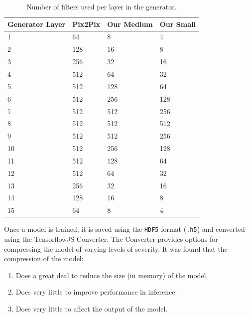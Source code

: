 \documentclass{article}
\begin{document}
\begin{small}
	\begin{table}
		\begin{center}
			\begin{tabular}{p{2cm}p{2cm}p{2cm}p{2cm}}
				\toprule
				Generator Layer & Pix2Pix & Our Medium & Our Small \\
				\midrule
				1               & 64      & 8          & 4         \\
				2               & 128     & 16         & 8         \\
				3               & 256     & 32         & 16        \\
				4               & 512     & 64         & 32        \\
				5               & 512     & 128        & 64        \\
				6               & 512     & 256        & 128       \\
				7               & 512     & 512        & 256       \\
				8               & 512     & 512        & 512       \\
				9               & 512     & 512        & 256       \\
				10              & 512     & 256        & 128       \\
				11              & 512     & 128        & 64        \\
				12              & 512     & 64         & 32        \\
				13              & 256     & 32         & 16        \\
				14              & 128     & 16         & 8         \\
				15              & 64      & 8          & 4         \\
				\bottomrule
			\end{tabular}
			\caption{Number of filters used per layer in the generator.\label{table:numFilters}}
		\end{center}
	\end{table}
\end{small}

Once a model is trained, it is saved using the \verb|HDF5| format (\verb|.h5|) and converted using the TensorflowJS Converter. The Converter provides options for compressing the model of varying levels of severity. It was found that the compression of the model:

\begin{enumerate}
	\item Does a great deal to reduce the size (in memory) of the model.
	\item Does very little to improve performance in inference.
	\item Does very little to affect the output of the model.
\end{enumerate}
\end{document}

